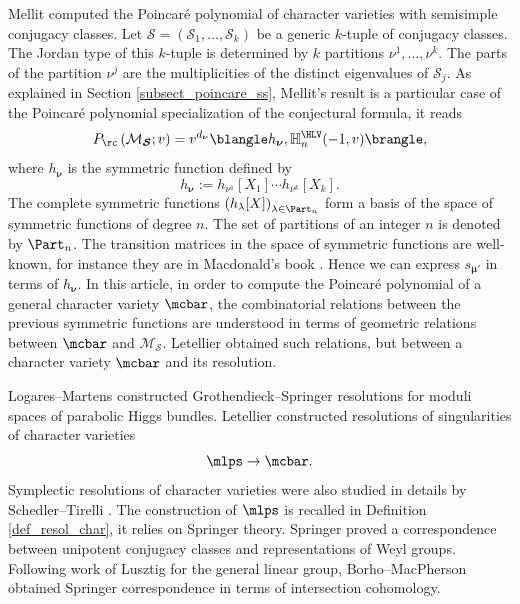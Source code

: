 Mellit \cite{Mellit2020} computed the Poincaré polynomial of character varieties with semisimple conjugacy classes. Let $\boldsymbol{\mathcal{S}}=\left(\mathcal{S}_1,\dots,\mathcal{S}_k\right)$ be a generic $k$-tuple of conjugacy classes. The Jordan type of this $k$-tuple is determined by $k$ partitions $\nu^1,\dots,\nu^k$. The parts of the partition $\nu^j$ are the multiplicities of the distinct eigenvalues of $\mathcal{S}_j$. As explained in Section \ref{subsect_poincare_ss}, Mellit's result is a particular case of the Poincaré polynomial specialization of the conjectural formula, it reads
\begin{equation}\label{eq_mellit_intro}
P_{\rc} \left(\mathcal{M}_{\boldsymbol{\mathcal{S}}};v\right) = v^{d_{\boldsymbol{\nu}}} \blangle h_{\boldsymbol{\nu}},\mathbb{H}_n^{\HLV}(-1,v)\brangle,
\end{equation}
where $h_{\boldsymbol{\nu}}$ is the symmetric function defined by
\[
h_{\boldsymbol{\nu}}:=h_{\nu^1}[X_1]\cdots h_{\nu^k}[X_k].
\]
The complete symmetric functions $\left(h_{\lambda}[X]\right)_{\lambda \in \Part_n}$ form a basis of the space of symmetric functions of degree $n$. The set of partitions of an integer $n$ is denoted by $\Part_n$. The transition matrices in the space of symmetric functions are well-known, for instance they are in Macdonald's book \cite{Macdonald}. Hence we can express $s_{\boldsymbol{\mu'}}$ in terms of $h_{\boldsymbol{\nu}}$. In this article, in order to compute the Poincaré polynomial of a general character variety $\mcbar$, the combinatorial relations between the previous symmetric functions are understood in terms of geometric relations between $\mcbar$ and $\mathcal{M}_{\boldsymbol{\mathcal{S}}}$. Letellier obtained such relations, but between a character variety $\mcbar$ and its resolution.


Logares--Martens \cite{Logares_Martens} constructed Grothendieck--Springer resolutions for moduli spaces of parabolic Higgs bundles. Letellier \cite{Letellier13} constructed resolutions of singularities of character varieties
\[
\mlps\to\mcbar.
\]
Symplectic resolutions of character varieties were also studied in details by Schedler--Tirelli \cite{Schedler_Tirelli}. The construction of $\mlps$ is recalled in Definition \ref{def_resol_char}, it relies on Springer theory. Springer \cite{Springer1976} proved a correspondence between unipotent conjugacy classes and representations of Weyl groups. Following work of Lusztig \cite{Lusztig81} for the general linear group, Borho--MacPherson \cite{Borho_MacPherson} obtained Springer correspondence in terms of intersection cohomology.

